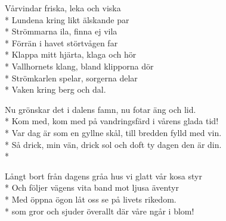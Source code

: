 \begin{SongText}
    \begin{SongVerse}
        Vårvindar friska, leka och viska\\*%
        Lundena kring likt älskande par\\*%
        Strömmarna ila, finna ej vila\\*%
        Förrän i havet störtvågen far\\*%
        Klappa mitt hjärta, klaga och hör\\*%
        Vallhornets klang, bland klipporna dör\\*%
        Strömkarlen spelar, sorgerna delar\\*%
        Vaken kring berg och dal.
    \end{SongVerse}
\end{SongText}

\begin{SongText}
    \begin{SongVerse}
        Nu grönskar det i dalens famn, nu fotar äng och lid.\\*%
        Kom med, kom med på vandringsfärd i vårens glada tid!\\*%
        Var dag är som en gyllne skål, till bredden fylld med vin.\\*%
        Så drick, min vän, drick sol och doft ty dagen den är din.\\*%
    \end{SongVerse}
    \begin{SongVerse}
        Långt bort från dagens gråa hus vi glatt vår kosa styr\\*%
        Och följer vägens vita band mot ljusa äventyr\\*%
        Med öppna ögon låt oss se på livets rikedom.\\*%
        som gror och sjuder överallt där våre ngår i blom!
    \end{SongVerse}
\end{SongText}

